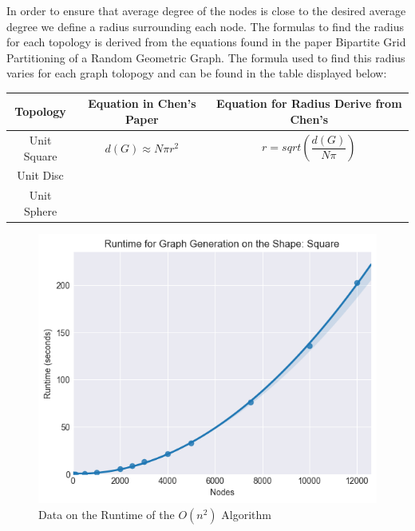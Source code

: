 \documentclass{article}
\begin{document}
  In order to ensure that average degree of the nodes is close to the desired average degree we define a radius surrounding each node.
  The formulas to find the radius for each topology is derived from the equations found in the paper Bipartite Grid Partitioning of a Random Geometric Graph\cite{chen2017bipartite}.
  The formula used to find this radius varies for each graph tolopogy and can be found in the table displayed below:

  \begin{tabular}{ |c|c|c| }
	  \hline
	  Topology & Equation in Chen's Paper & Equation for Radius Derive from Chen's \\
	  \hline
	  Unit Square & $d(G) \approx N\pi r^2 $ & $r = sqrt(\dfrac{d(G)}{N\pi})$ \\ 
	  \hline
	  Unit Disc   & & \\
	  \hline
	  Unit Sphere & & \\
	  \hline
  \end{tabular}

  \begin{figure}[!htb]
    \centering
    \includegraphics[width=1 \textwidth]{square/runtime/runtime_chart_naive}
    \caption{Data on the Runtime of the $O(n^2)$ Algorithm}
  \end{figure}
\end{document}
